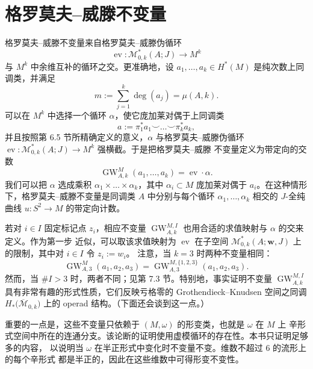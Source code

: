 
\section{格罗莫夫--威滕不变量}\label{sec:1-4}

格罗莫夫--威滕不变量来自格罗莫夫--威滕伪循环
\[
  \operatorname{ev}:\mathcal M^*_{0,k}(A;J)\longrightarrow M^k
\]
与 $M^k$ 中余维互补的循环之交。更准确地，设
$a_1,\dots,a_k\in H^*(M)$ 是纯次数上同调类，并满足
\[
  m:=\sum_{j=1}^k\deg(a_j)=\mu(A,k).
\]
可以在 $M^k$ 中选择一个循环 $\alpha$，使它庞加莱对偶于上同调类
\[
  a:=\pi_1^*a_1\smile\dots\smile\pi_k^*a_k,
\]
并且按照第 6.5 节所精确定义的意义，$\alpha$ 与格罗莫夫--威滕伪循环
$\operatorname{ev}:\mathcal M^*_{0,k}(A;J)\to M^k$ 强横截。于是把格罗莫夫--威滕
不变量定义为带定向的交数
\[
  \operatorname{GW}_{A,k}^M(a_1,\dots,a_k)=\operatorname{ev}\cdot\alpha.
\]
我们可以把 $\alpha$ 选成乘积 $\alpha_1\times\dots\times\alpha_k$，其中
$\alpha_i\subset M$ 庞加莱对偶于 $a_i$。在这种情形下，格罗莫夫--威滕不变量是同调类
$A$ 中分别与每个循环 $\alpha_1,\dots,\alpha_k$ 相交的 $J$-全纯曲线
$u:S^2\to M$ 的带定向计数。

若对 $i\in I$ 固定标记点 $z_i$，相应不变量
$\operatorname{GW}_{A,k}^{M,I}$ 也用合适的求值映射与 $\alpha$ 的交来定义。作为第一步
近似，可以取该求值映射为 $\operatorname{ev}$ 在子空间
$\mathcal M^*_{0,k}(A;\mathbf w,J)$ 上的限制，其中对 $i\in I$ 令 $z_i:=w_i$。
注意，当 $k=3$ 时两种不变量相同：
\[
  \operatorname{GW}_{A,3}^M(a_1,a_2,a_3)
  =\operatorname{GW}_{A,3}^{M,\{1,2,3\}}(a_1,a_2,a_3).
\]
然而，当 $\#I>3$ 时，两者不同；见第 7.3 节。特别地，事实证明不变量
$\operatorname{GW}_{A,k}^{M,I}$ 具有非常有趣的形式性质，它们反映亏格零的
Grothendieck--Knudsen 空间之同调
$H_*\bigl(\overline{\mathcal M}_{0,k}\bigr)$ 上的 operad 结构。（下面还会谈到这一点。）

重要的一点是，这些不变量只依赖于 $(M,\omega)$ 的形变类，也就是 $\omega$ 在 $M$ 上
辛形式空间中所在的连通分支。该论断的证明使用虚模循环的存在性。本书只证明足够多的内容，
以说明当 $\omega$ 在半正形式中变化时不变量不变。维数不超过 $6$ 的流形上的每个辛形式
都是半正的，因此在这些维数中可得形变不变性。

